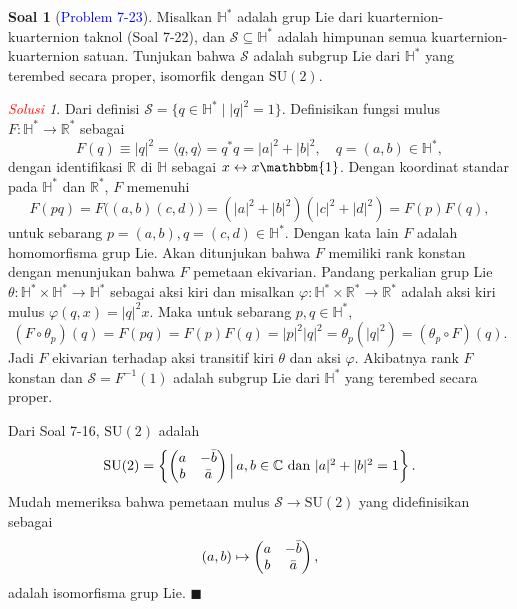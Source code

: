 \documentclass[11pt]{article}
\theoremstyle{definition}
\newtheorem*{problem}{Soal}
\theoremstyle{remark}
\newtheorem*{solution}{\textcolor{red}{Solusi}}
\newcommand{\er}{\mathbb{R}}            %
\newcommand{\C}{\mathbb{C}}             %
\newcommand{\Hreal}{\mathbb{H}}	        %
\newcommand{\satukuart}{\mathbbm{1}}    %
\newcommand\metric[1]{\langle#1\rangle}     %
\begin{document}
\begin{problem}[\textcolor{blue}{Problem 7-23}]
Misalkan $\Hreal^*$ adalah grup Lie dari kuarternion-kuarternion taknol (Soal 7-22), dan $\mathcal{S}\subseteq \Hreal^*$ adalah himpunan semua kuarternion-kuarternion satuan. Tunjukan bahwa $\mathcal{S}$ adalah subgrup Lie dari $\Hreal^*$ yang terembed secara proper, isomorfik dengan $\text{SU}(2)$. 
\end{problem}
\begin{solution}
Dari definisi $\mathcal{S} = \{ q \in \Hreal^* \mid |q|^2 = 1 \}$. Definisikan fungsi mulus $F : \Hreal^* \to \er^*$ sebagai 
$$
F(q) \equiv |q|^2 = \metric{q,q} = q^*q=|a|^2+|b|^2, \quad q=(a,b) \in \Hreal^*,
$$
dengan identifikasi $\er$ di $\Hreal$ sebagai $x \leftrightarrow x \satukuart$. Dengan koordinat standar pada $\Hreal^*$ dan $\er^*$, $F$ memenuhi 
$$
F(pq) = F\big((a,b)(c,d)\big) = (|a|^2+|b|^2)(|c|^2+|d|^2) = F(p)F(q),
$$
untuk sebarang $p=(a,b),q=(c,d) \in \Hreal^*$. Dengan kata lain $F$ adalah homomorfisma grup Lie. Akan ditunjukan bahwa $F$ memiliki rank konstan dengan menunjukan bahwa $F$ pemetaan ekivarian. Pandang perkalian grup Lie $\theta : \Hreal^* \times \Hreal^* \to \Hreal^*$ sebagai aksi kiri dan misalkan $\varphi : \Hreal^* \times \er^* \to \er^*$ adalah aksi kiri mulus $\varphi(q,x) = |q|^2x$. Maka untuk sebarang $p,q \in \Hreal^*$,
$$
(F \circ \theta_p) (q) = F(pq) = F(p)F(q) = |p|^2|q|^2 = \theta_{p}(|q|^2)= (\theta_p \circ F)(q).
$$
Jadi $F$ ekivarian terhadap aksi transitif kiri $\theta$ dan aksi $\varphi$. Akibatnya rank $F$ konstan dan $\mathcal{S} = F^{-1}(1)$ adalah subgrup Lie dari $\Hreal^*$ yang terembed secara proper. 

Dari Soal 7-16, $\text{SU}(2)$ adalah 
$$
\text{SU}(2) = 
    \begin{Bmatrix}
        \begin{pmatrix} 
        a & -\Bar{b} \\
        b & \Bar{a} 
        \end{pmatrix} 
        \Big| \, a,b \in \C \text{ dan } |a|^2+|b|^2 = 1 
    \end{Bmatrix}.
$$
Mudah memeriksa bahwa pemetaan mulus $\mathcal{S} \to \text{SU}(2)$ yang didefinisikan sebagai
$$
(a,b) \mapsto \begin{pmatrix} a & -\Bar{b} \\ b & \Bar{a} \end{pmatrix}, 
$$
adalah isomorfisma grup Lie. $\blacksquare$
\end{solution}
\end{document}
